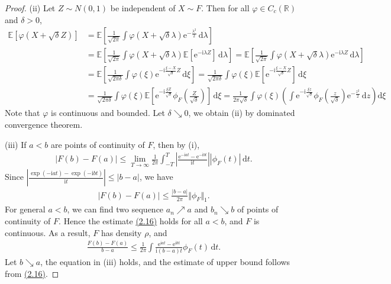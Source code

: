 \documentclass{article}
\numberwithin{equation}{section}
\newcommand{\e}{\mathrm{e}}
\newcommand{\E}{\mathbb{E}}
\renewcommand{\d}{\mathrm{d}}
\renewcommand{\i}{\mathrm{i}}
\theoremstyle{plain}
\theoremstyle{definition}
\begin{document}
\begin{proof}
(ii) Let $Z\sim N(0,1)$ be independent of $X\sim F$. Then for all $\varphi\in C_c(\mathbb{R})$ and $\delta>0$,
\begin{align*}
	\E\left[\varphi(X+\sqrt{\delta}Z)\right] &= \E\left[\frac{1}{\sqrt{2\pi}}\int\varphi(X+\sqrt{\delta}\lambda)\e^{-\frac{\lambda^2}{2}}\,\d \lambda\right]\\
	&= \E\left[\frac{1}{\sqrt{2\pi}}\int\varphi(X+\sqrt{\delta}\lambda)\E\left[\e^{-\i\lambda Z}\right]\,\d \lambda\right] =\E\left[\frac{1}{\sqrt{2\pi}}\int\varphi(X+\sqrt{\delta}\lambda)\e^{-\i\lambda Z}\,\d \lambda\right]\\
	&=\E\left[\frac{1}{\sqrt{2\pi\delta}}\int\varphi(\xi)\e^{-\i\frac{\xi - X}{\sqrt{\delta}}Z}\,\d \xi\right] = \frac{1}{\sqrt{2\pi\delta}}\int\varphi(\xi)\E\left[\e^{-\i\frac{\xi - X}{\sqrt{\delta}}Z}\right]\,\d \xi\\
	&=\frac{1}{\sqrt{2\pi\delta}}\int\varphi(\xi)\E\left[\e^{-\i\frac{\xi Z}{\sqrt{\delta}}}\phi_F\left(\frac{Z}{\sqrt{\delta}}\right)\right]\,\d \xi =\frac{1}{2\pi\sqrt{\delta}}\int\varphi(\xi)\left(\int\e^{-\i\frac{\xi z}{\sqrt{\delta}}}\phi_F\left(\frac{z}{\sqrt{\delta}}\right)\e^{-\frac{z^2}{2}}\,\d z\right)\d\xi
\end{align*}
Note that $\varphi$ is continuous and bounded. Let $\delta\searrow 0$, we obtain (ii) by dominated convergence theorem. \vspace{0.1cm}

(iii) If $a<b$ are points of continuity of $F$, then by (i),
\begin{align*}
	\vert F(b)-F(a)\vert \leq \lim_{T\to\infty}\frac{1}{2\pi}\int_{-T}^T\left\vert\frac{\e^{-\i at}-\e^{-\i bt}}{\i t}\right\vert\left\vert\phi_F(t)\right\vert\,\d t.
\end{align*}
Since $\left\vert\frac{\exp(-\i at)-\exp(-\i bt)}{\i t}\right\vert\leq\vert b-a\vert$, we have 
\begin{align*}
	\vert F(b)-F(a)\vert\leq\frac{\vert b-a\vert}{2\pi}\Vert\phi_F\Vert_1.\tag{2.16}\label{eq:2.16}
\end{align*} 
For general $a<b$, we can find two sequence $a_n\nearrow a$ and $b_n\searrow b$ of points of continuity of $F$. Hence the estimate \hyperref[eq:2.16]{(2.16)} holds for all $a<b$, and $F$ is continuous. As a result, $F$ has density $\rho$, and
\begin{align*}
	\frac{F(b)-F(a)}{b-a}\leq\frac{1}{2\pi}\int\frac{\e^{\i at}-\e^{\i bt}}{\i(b-a)t}\phi_F(t)\,\d t.
\end{align*}
Let $b\searrow a$, the equation in (iii) holds, and the estimate of upper bound follows from \hyperref[eq:2.16]{(2.16)}.
\end{proof}
\end{document}
